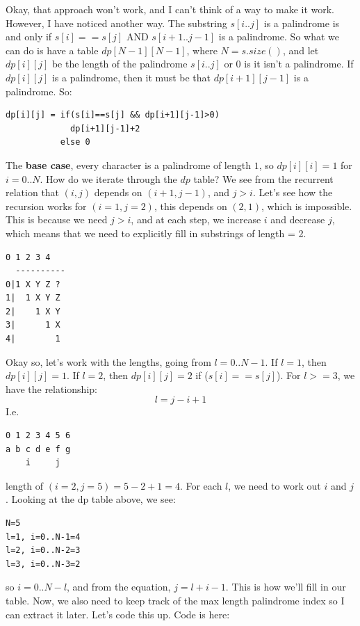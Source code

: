 Okay, that approach won't work, and I can't think of a way to make it work.
However, I have noticed another way. The substring $s[i..j]$ is a palindrome
is and only if $s[i]==s[j]$ AND $s[i+1..j-1]$ is a palindrome. So what we
can do is have a table $dp[N-1][N-1]$, where $N=s.size()$, and let
$dp[i][j]$ be the length of the palindrome $s[i..j]$ or $0$ is it isn't a
palindrome. If $dp[i][j]$ is a palindrome, then it must be that
$dp[i+1][j-1]$ is a palindrome. So:
\begin{lstlisting}[style=raygeneric]
dp[i][j] = if(s[i]==s[j] && dp[i+1][j-1]>0)
             dp[i+1][j-1]+2
           else 0
\end{lstlisting}
The \textbf{base case}, every character is a palindrome of length $1$, so
$dp[i][i]=1$ for $i=0..N$. How do we iterate through the $dp$ table? We see
from the recurrent relation that $(i,j)$ depends on $(i+1,j-1)$, and $j>i$.
Let's see how the recursion works for $(i=1,j=2)$, this depends on $(2,1)$,
which is impossible. This is because we need $j>i$, and at each step, we
increase $i$ and decrease $j$, which means that we need to explicitly fill
in substrings of length = 2.
\begin{lstlisting}[style=raygeneric]
  0 1 2 3 4
  ----------
0|1 X Y Z ?
1|  1 X Y Z
2|    1 X Y
3|      1 X
4|        1
\end{lstlisting}
Okay so, let's work with the lengths, going from $l=0..N-1$. If $l=1$, then
$dp[i][j]=1$. If $l=2$, then $dp[i][j]=2$ if ($s[i]==s[j]$). For $l>=3$, we
have the relationship:
\begin{equation*}
l=j-i+1
\end{equation*}
I.e.
\begin{lstlisting}[style=raygeneric]
0 1 2 3 4 5 6
a b c d e f g
    i     j
\end{lstlisting}
length of $(i=2,j=5)=5-2+1=4$. For each $l$, we need to work out $i$ and
$j$. Looking at the dp table above, we see:
\begin{lstlisting}[style=raygeneric]
N=5
l=1, i=0..N-1=4
l=2, i=0..N-2=3
l=3, i=0..N-3=2
\end{lstlisting}
so $i=0..N-l$, and from the equation, $j=l+i-1$.  This is how we'll fill in
our table. Now, we also need to keep track of the max length palindrome
index so I can extract it later. Let's code this up. Code is here:
